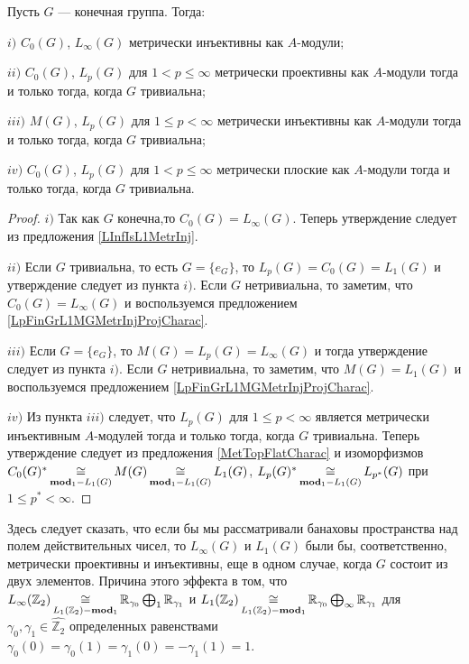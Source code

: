 \begin{proposition}\label{StdModFinGrL1MGMetrInjProjFlatCharac} Пусть $G$ --- конечная группа. Тогда:

$i)$ $C_0(G)$, $L_\infty(G)$ метрически инъективны как $A$-модули;

$ii)$ $C_0(G)$, $L_p(G)$ для $1<p\leq\infty$ метрически проективны как $A$-модули тогда и только тогда, когда $G$ тривиальна;

$iii)$ $M(G)$, $L_p(G)$ для $1\leq p<\infty$ метрически инъективны как $A$-модули тогда и только тогда, когда $G$ тривиальна;

$iv)$ $C_0(G)$, $L_p(G)$ для $1<p\leq\infty$ метрически плоские как $A$-модули тогда и только тогда, когда $G$ тривиальна.
\end{proposition}
\begin{proof}
$i)$ Так как $G$ конечна,то $C_0(G)=L_\infty(G)$. Теперь утверждение следует из предложения \ref{LInfIsL1MetrInj}.

$ii)$ Если $G$ тривиальна, то есть $G=\{e_G\}$, то $L_p(G)=C_0(G)=L_1(G)$ и утверждение следует из пункта $i)$. Если $G$ нетривиальна, то заметим, что $C_0(G)=L_\infty(G)$ и воспользуемся предложением \ref{LpFinGrL1MGMetrInjProjCharac}.

$iii)$ Если $G=\{e_G\}$, то $M(G)=L_p(G)=L_\infty(G)$ и тогда утверждение следует из пункта $i)$. Если $G$ нетривиальна, то заметим, что $M(G)=L_1(G)$ и воспользуемся предложением \ref{LpFinGrL1MGMetrInjProjCharac}.

$iv)$ Из пункта $iii)$ следует, что $L_p(G)$ для $1\leq p<\infty$ является метрически инъективным $A$-модулей тогда и только тогда, когда $G$ тривиальна. Теперь утверждение следует из предложения \ref{MetTopFlatCharac} и изоморфизмов $C_0(G)^*\mathop{\mathbin{\cong}}\limits_{\mathbf{mod}_1-L_1(G)}M(G)\mathop{\mathbin{\cong}}\limits_{\mathbf{mod}_1-L_1(G)}L_1(G)$, $L_p(G)^*\mathop{\mathbin{\cong}}\limits_{\mathbf{mod}_1-L_1(G)}L_{p^*}(G)$ при $1\leq p^*<\infty$.
\end{proof}

Здесь следует сказать, что если бы мы рассматривали банаховы пространства над полем действительных чисел, то $L_\infty(G)$ и $L_1(G)$ были бы, соответственно, метрически проективны и инъективны, еще в одном случае, когда $G$ состоит из двух элементов. Причина этого эффекта в том, что 
$L_\infty(\mathbb{Z}_2)\mathop{\mathbin{\cong}}\limits_{L_1(\mathbb{Z}_2)-\mathbf{mod}_1}\mathbb{R}_{\gamma_0}\bigoplus\nolimits_1\mathbb{R}_{\gamma_1}
$ и $L_1(\mathbb{Z}_2)\mathop{\mathbin{\cong}}\limits_{L_1(\mathbb{Z}_2)-\mathbf{mod}_1}\mathbb{R}_{\gamma_0}\bigoplus\nolimits_\infty\mathbb{R}_{\gamma_1}$ для $\gamma_0,\gamma_1\in\widehat{\mathbb{Z}_2}$ определенных равенствами $\gamma_0(0)=\gamma_0(1)=\gamma_1(0)=-\gamma_1(1)=1$.

